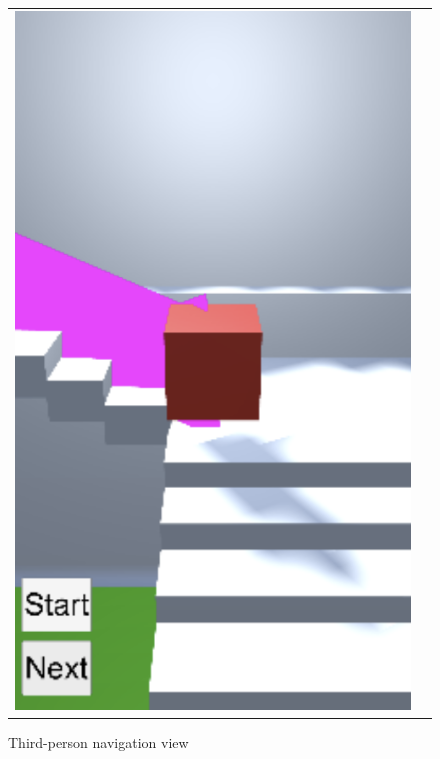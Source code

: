         
        \begin{figure}
            \begin{tabular}{@{}cc@{}}
                \begin{minipage}[b]{0.35\textwidth} \includegraphics[width=\columnwidth]{figures/demos/indoor_navmesh_3p.png}
                    \caption{Third-person navigation view}   
                    \label{3:fig:indoor_navmesh_3p}
                \end{minipage}
            \end{tabular}
        \end{figure}
        
